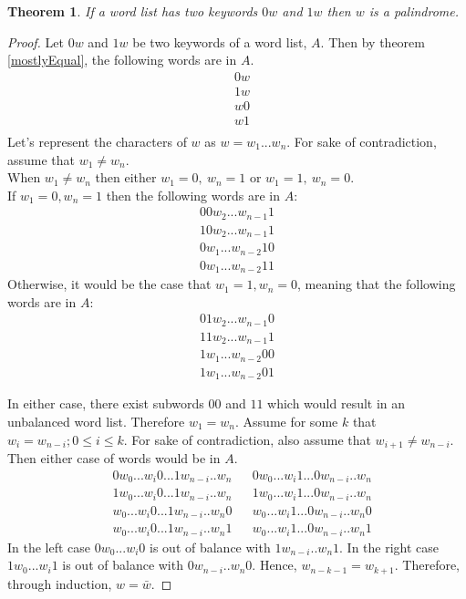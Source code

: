 \documentclass{article}
\newtheorem{theorem}{Theorem}[section]
\begin{document}
\begin{theorem}
    If a word list has two keywords $0w$ and $1w$ then $w$ is a palindrome.
\end{theorem}
\begin{proof}
    Let $0w$ and $1w$ be two keywords of a word list, $A$. Then by theorem \ref{mostlyEqual}, the following words are in $A$.
    \begin{align*}
        &0w \\
        &1w \\
        &w0 \\
        &w1 \\
    \end{align*}
    Let's represent the characters of $w$ as $w = w_1...w_n$. For sake of contradiction, assume that $w_1 \neq w_n$. \\
    When $w_1 \neq w_n$ then either $w_1 = 0,\ w_n = 1$ or $w_1 = 1,\ w_n = 0$.\\
    If $w_1 = 0, w_n = 1$ then the following words are in $A$:
    \begin{align*}
        00w_2...w_{n-1}1 \\
        10w_2...w_{n-1}1 \\
        0w_1...w_{n-2}10 \\
        0w_1...w_{n-2}11  
    \end{align*}
    Otherwise, it would be the case that $w_1 = 1, w_n = 0$, meaning that the following words are in $A$:
    \begin{align*}
        01w_2...w_{n-1}0 \\  
        11w_2...w_{n-1}1 \\ 
        1w_1...w_{n-2}00 \\
        1w_1...w_{n-2}01
    \end{align*}

    In either case, there exist subwords $00$ and $11$ which would result in an unbalanced word list. Therefore $w_1 = w_n$.
    Assume for some $k$ that $w_i = w_{n - i}; 0 \leq i \leq k$. For sake of contradiction, also assume that $w_{i + 1} \neq w_{n - i}$. Then either case of words would be in $A$.
    \begin{align*}
        &0w_0...w_i0...1w_{n-i}..w_{n} &    &0w_0...w_i1...0w_{n-i}..w_{n} \\
        &1w_0...w_i0...1w_{n-i}..w_{n} &    &1w_0...w_i1...0w_{n-i}..w_{n} \\
        &w_0...w_i0...1w_{n-i}..w_{n}0 &    &w_0...w_i1...0w_{n-i}..w_{n}0 \\
        &w_0...w_i0...1w_{n-i}..w_{n}1 &    &w_0...w_i1...0w_{n-i}..w_{n}1 
    \end{align*}
    In the left case $0w_0...w_i0$ is out of balance with $1w_{n-i}..w_{n}1$. In the right case $1w_0...w_i1$ is out of balance with $0w_{n-i}..w_{n}0$. Hence, $w_{n-k-1} = w_{k+1}$. Therefore, through induction, $w = \bar w$.
\end{proof}
\end{document}
